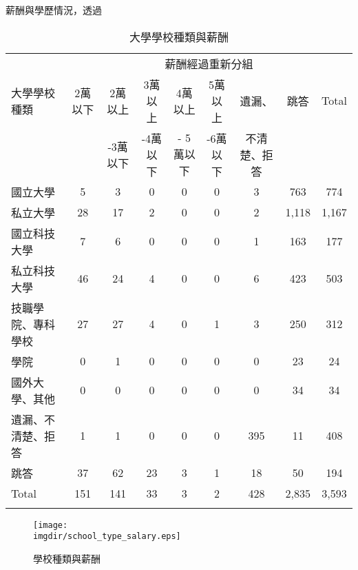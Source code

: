 \documentclass[12pt, a4paper]{article}
\begin{document}
薪酬與學歷情況，透過
\begin{table}[ht]
\centering
\renewcommand{\arraystretch}{1.3} %
\extrarowheight=4pt
\caption{大學學校種類與薪酬}
\begin{adjustbox}{width=\textwidth}
\begin{tabular}{l*{8}{c}}
\toprule
& \multicolumn{8}{c}{薪酬經過重新分組} \\
\cmidrule(lr){2-9}
大學學校種類 & 2萬以下 & 2萬以上& 3萬以上 & 4萬以上 & 5萬以上 & 遺漏、 & 跳答 & Total \\
		   &    &-3萬以下    & -4萬以下  &- 5萬以下    & -6萬以下   & 不清楚、拒答   &   &  \\
\midrule
國立大學 & 5 & 3 & 0 & 0 & 0 & 3 & 763 & 774 \\
私立大學 & 28 & 17 & 2 & 0 & 0 & 2 & 1,118 & 1,167 \\
國立科技大學 & 7 & 6 & 0 & 0 & 0 & 1 & 163 & 177 \\
私立科技大學 & 46 & 24 & 4 & 0 & 0 & 6 & 423 & 503 \\
技職學院、專科學校 & 27 & 27 & 4 & 0 & 1 & 3 & 250 & 312 \\
學院 & 0 & 1 & 0 & 0 & 0 & 0 & 23 & 24 \\
國外大學、其他 & 0 & 0 & 0 & 0 & 0 & 0 & 34 & 34 \\
遺漏、不清楚、拒答 & 1 & 1 & 0 & 0 & 0 & 395 & 11 & 408 \\
跳答 & 37 & 62 & 23 & 3 & 1 & 18 & 50 & 194 \\
Total & 151 & 141 & 33 & 3 & 2 & 428 & 2,835 & 3,593 \\
\bottomrule
\label{tab:school_wage}
\end{tabular}
\end{adjustbox}
\end{table}



\begin{figure}[H]
    \centering    
        \texttt{[image: \\imgdir/school\_type\_salary.eps]}
        \caption{學校種類與薪酬}
        \label{pic:school_salary}
\end{figure}
\end{document}
